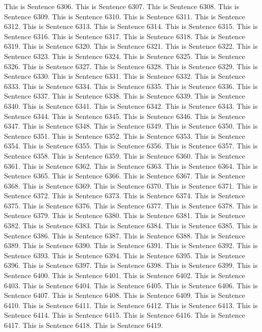 \documentclass{article}
\begin{document}
This is Sentence 6306.
This is Sentence 6307.
This is Sentence 6308.
This is Sentence 6309.
This is Sentence 6310.
This is Sentence 6311.
This is Sentence 6312.
This is Sentence 6313.
This is Sentence 6314.
This is Sentence 6315.
This is Sentence 6316.
This is Sentence 6317.
This is Sentence 6318.
This is Sentence 6319.
This is Sentence 6320.
This is Sentence 6321.
This is Sentence 6322.
This is Sentence 6323.
This is Sentence 6324.
This is Sentence 6325.
This is Sentence 6326.
This is Sentence 6327.
This is Sentence 6328.
This is Sentence 6329.
This is Sentence 6330.
This is Sentence 6331.
This is Sentence 6332.
This is Sentence 6333.
This is Sentence 6334.
This is Sentence 6335.
This is Sentence 6336.
This is Sentence 6337.
This is Sentence 6338.
This is Sentence 6339.
This is Sentence 6340.
This is Sentence 6341.
This is Sentence 6342.
This is Sentence 6343.
This is Sentence 6344.
This is Sentence 6345.
This is Sentence 6346.
This is Sentence 6347.
This is Sentence 6348.
This is Sentence 6349.
This is Sentence 6350.
This is Sentence 6351.
This is Sentence 6352.
This is Sentence 6353.
This is Sentence 6354.
This is Sentence 6355.
This is Sentence 6356.
This is Sentence 6357.
This is Sentence 6358.
This is Sentence 6359.
This is Sentence 6360.
This is Sentence 6361.
This is Sentence 6362.
This is Sentence 6363.
This is Sentence 6364.
This is Sentence 6365.
This is Sentence 6366.
This is Sentence 6367.
This is Sentence 6368.
This is Sentence 6369.
This is Sentence 6370.
This is Sentence 6371.
This is Sentence 6372.
This is Sentence 6373.
This is Sentence 6374.
This is Sentence 6375.
This is Sentence 6376.
This is Sentence 6377.
This is Sentence 6378.
This is Sentence 6379.
This is Sentence 6380.
This is Sentence 6381.
This is Sentence 6382.
This is Sentence 6383.
This is Sentence 6384.
This is Sentence 6385.
This is Sentence 6386.
This is Sentence 6387.
This is Sentence 6388.
This is Sentence 6389.
This is Sentence 6390.
This is Sentence 6391.
This is Sentence 6392.
This is Sentence 6393.
This is Sentence 6394.
This is Sentence 6395.
This is Sentence 6396.
This is Sentence 6397.
This is Sentence 6398.
This is Sentence 6399.
This is Sentence 6400.
This is Sentence 6401.
This is Sentence 6402.
This is Sentence 6403.
This is Sentence 6404.
This is Sentence 6405.
This is Sentence 6406.
This is Sentence 6407.
This is Sentence 6408.
This is Sentence 6409.
This is Sentence 6410.
This is Sentence 6411.
This is Sentence 6412.
This is Sentence 6413.
This is Sentence 6414.
This is Sentence 6415.
This is Sentence 6416.
This is Sentence 6417.
This is Sentence 6418.
This is Sentence 6419.
\end{document}
